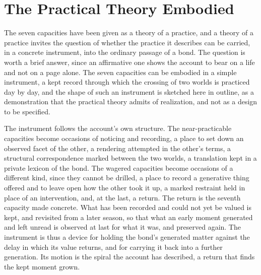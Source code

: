 \section{The Practical Theory Embodied}
\label{p27:sec:instrument}

\noindent
The seven capacities have been given as a theory of a practice, and a theory of a practice invites the question of whether the practice it describes can be carried, in a concrete instrument, into the ordinary passage of a bond. The question is worth a brief answer, since an affirmative one shows the account to bear on a life and not on a page alone. The seven capacities can be embodied in a simple instrument, a kept record through which the crossing of two worlds is practiced day by day, and the shape of such an instrument is sketched here in outline, as a demonstration that the practical theory admits of realization, and not as a design to be specified.

The instrument follows the account's own structure. The near-practicable capacities become occasions of noticing and recording, a place to set down an observed facet of the other, a rendering attempted in the other's terms, a structural correspondence marked between the two worlds, a translation kept in a private lexicon of the bond. The wagered capacities become occasions of a different kind, since they cannot be drilled, a place to record a generative thing offered and to leave open how the other took it up, a marked restraint held in place of an intervention, and, at the last, a return. The return is the seventh capacity made concrete. What has been recorded and could not yet be valued is kept, and revisited from a later season, so that what an early moment generated and left unread is observed at last for what it was, and preserved again. The instrument is thus a device for holding the bond's generated matter against the delay in which its value returns, and for carrying it back into a further generation. Its motion is the spiral the account has described, a return that finds the kept moment grown.


